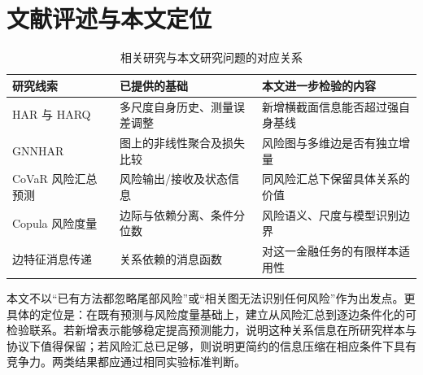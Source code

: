 \section{文献评述与本文定位}
\begin{table}[htbp]\centering\small
\caption{相关研究与本文研究问题的对应关系}
\begin{tabularx}{\textwidth}{p{}YY}
\toprule 研究线索 & 已提供的基础 & 本文进一步检验的内容\\\midrule
HAR 与 HARQ & 多尺度自身历史、测量误差调整 & 新增横截面信息能否超过强自身基线\\
GNNHAR & 图上的非线性聚合及损失比较 & 风险图与多维边是否有独立增量\\
CoVaR 风险汇总预测 & 风险输出/接收及状态信息 & 同风险汇总下保留具体关系的价值\\
Copula 风险度量 & 边际与依赖分离、条件分位数 & 风险语义、尺度与模型识别边界\\
边特征消息传递 & 关系依赖的消息函数 & 对这一金融任务的有限样本适用性\\\bottomrule
\end{tabularx}
\end{table}
本文不以“已有方法都忽略尾部风险”或“相关图无法识别任何风险”作为出发点。更具体的定位是：在既有预测与风险度量基础上，建立从风险汇总到逐边条件化的可检验联系。若新增表示能够稳定提高预测能力，说明这种关系信息在所研究样本与协议下值得保留；若风险汇总已足够，则说明更简约的信息压缩在相应条件下具有竞争力。两类结果都应通过相同实验标准判断。
